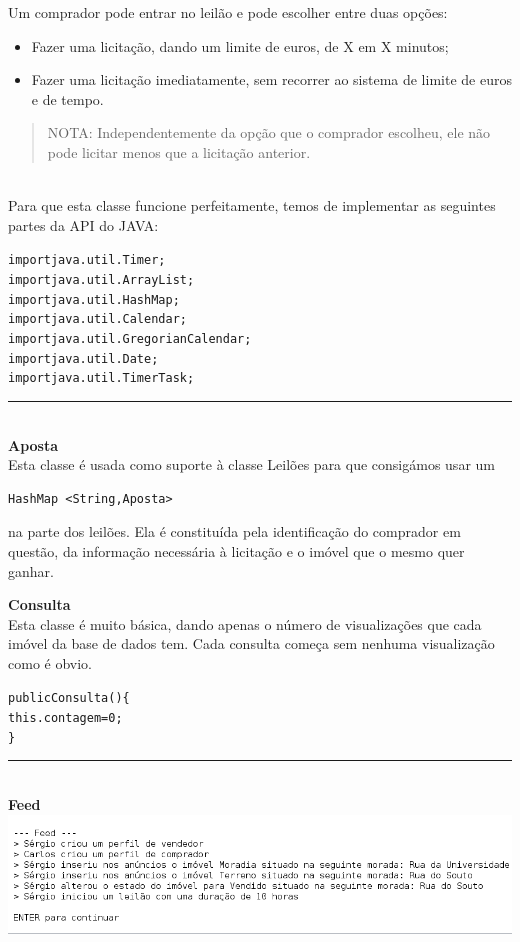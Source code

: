 \documentclass[12pt]{article}
\newenvironment{code}                    
{\textbf{
} \hspace{1cm} \hrulefill \\ 
\smallskip 
\begin{center}
\begin{minipage}{0.9\textwidth} 
\begin{alltt}\small}
{\end{alltt}
\end{minipage}
\end{center}
\hrule\smallskip
}
\begin{document}
Um comprador pode entrar no leilão e pode escolher entre duas opções:
\begin{itemize}
\item Fazer uma licitação, dando um limite de euros, de X em X minutos; 
\item Fazer uma licitação imediatamente, sem recorrer ao sistema de limite de euros e de tempo.
\end{itemize}
\begin{quote}
NOTA: Independentemente da opção que o comprador escolheu, ele não pode licitar menos que a licitação anterior.
\end{quote}
~\\

Para que esta classe funcione perfeitamente, temos de implementar as seguintes partes da API do JAVA:
\newline
\begin{code}
import java.util.Timer;
import java.util.ArrayList;
import java.util.HashMap;
import java.util.Calendar;
import java.util.GregorianCalendar;
import java.util.Date;
import java.util.TimerTask;
\end{code}
~\\

\textbf{Aposta}
\newline
~\\

Esta classe é usada como suporte à classe Leilões para que consigámos usar um 
\begin{verbatim}
HashMap <String,Aposta>
\end{verbatim}
na parte dos leilões.
Ela é constituída pela identificação do comprador em questão, da informação necessária à licitação e o imóvel que o mesmo quer ganhar.

\textbf{Consulta}
\newline
~\\

Esta classe é muito básica, dando apenas o número de visualizações que cada imóvel da base de dados tem.
Cada consulta começa sem nenhuma visualização como é obvio.
\begin{code}
public Consulta()\{
        this.contagem = 0;
    \}
\end{code}
~\\

\textbf{Feed}
\newline
~\\
\includegraphics[scale=0.5]{011.png}
~\\
\end{document}
